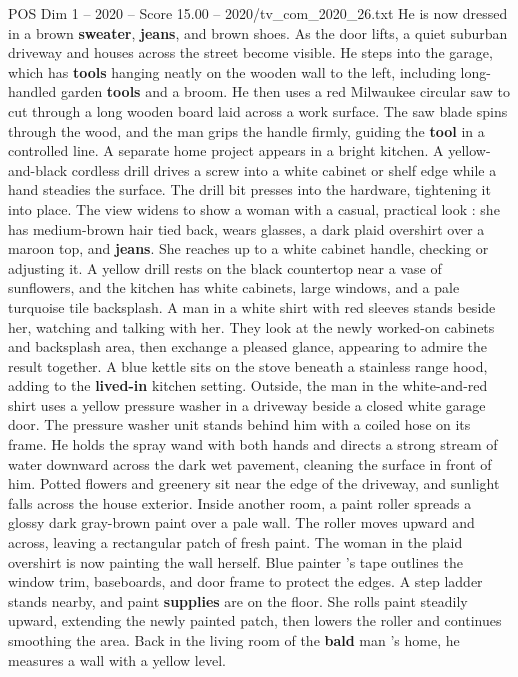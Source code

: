 \begin{textsample}{POS Dim 1 – 2020 – Score 15.00 – 2020/tv\_com\_2020\_26.txt}
He is now dressed in a brown \textbf{sweater}, \textbf{jeans}, and brown shoes.
As the door lifts, a quiet suburban driveway and houses across the street become visible.
He steps into the garage, which has \textbf{tools} hanging neatly on the wooden wall to the left, including long-handled garden \textbf{tools} and a broom.
He then uses a red Milwaukee circular saw to cut through a long wooden board laid across a work surface.
The saw blade spins through the wood, and the man grips the handle firmly, guiding the \textbf{tool} in a controlled line.
A separate home project appears in a bright kitchen.
A yellow-and-black cordless drill drives a screw into a white cabinet or shelf edge while a hand steadies the surface.
The drill bit presses into the hardware, tightening it into place.
The view widens to show a woman with a casual, practical look : she has medium-brown hair tied back, wears glasses, a dark plaid overshirt over a maroon top, and \textbf{jeans}.
She reaches up to a white cabinet handle, checking or adjusting it.
A yellow drill rests on the black countertop near a vase of sunflowers, and the kitchen has white cabinets, large windows, and a pale turquoise tile backsplash.
A man in a white shirt with red sleeves stands beside her, watching and talking with her.
They look at the newly worked-on cabinets and backsplash area, then exchange a pleased glance, appearing to admire the result together.
A blue kettle sits on the stove beneath a stainless range hood, adding to the \textbf{lived-in} kitchen setting.
Outside, the man in the white-and-red shirt uses a yellow pressure washer in a driveway beside a closed white garage door.
The pressure washer unit stands behind him with a coiled hose on its frame.
He holds the spray wand with both hands and directs a strong stream of water downward across the dark wet pavement, cleaning the surface in front of him.
Potted flowers and greenery sit near the edge of the driveway, and sunlight falls across the house exterior.
Inside another room, a paint roller spreads a glossy dark gray-brown paint over a pale wall.
The roller moves upward and across, leaving a rectangular patch of fresh paint.
The woman in the plaid overshirt is now painting the wall herself.
Blue painter ’s tape outlines the window trim, baseboards, and door frame to protect the edges.
A step ladder stands nearby, and paint \textbf{supplies} are on the floor.
She rolls paint steadily upward, extending the newly painted patch, then lowers the roller and continues smoothing the area.
Back in the living room of the \textbf{bald} man ’s home, he measures a wall with a yellow level.

\end{textsample}
